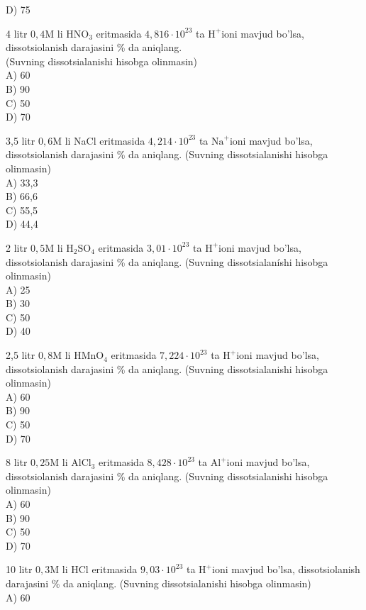 D) 75
  \item 4 litr $0,4 \mathrm{M}$ li $\mathrm{HNO}_{3}$ eritmasida $4,816 \cdot 10^{23}$ ta $\mathrm{H}^{+}$ioni mavjud bo'lsa, dissotsiolanish darajasini \% da aniqlang.\\
(Suvning dissotsialanishi hisobga olinmasin)\\
A) 60\\
B) 90\\
C) 50\\
D) 70
  \item 3,5 litr $0,6 \mathrm{M}$ li NaCl eritmasida $4,214 \cdot 10^{23}$ ta $\mathrm{Na}^{+}$ioni mavjud bo'lsa, dissotsiolanish darajasini \% da aniqlang. (Suvning dissotsialanishi hisobga olinmasin)\\
A) 33,3\\
B) 66,6\\
C) 55,5\\
D) 44,4
  \item 2 litr $0,5 \mathrm{M}$ li $\mathrm{H}_{2} \mathrm{SO}_{4}$ eritmasida $3,01 \cdot 10^{23}$ ta $\mathrm{H}^{+}$ioni mavjud bo'lsa, dissotsiolanish darajasini \% da aniqlang. (Suvning dissotsialaníshi hisobga olinmasin)\\
A) 25\\
B) 30\\
C) 50\\
D) 40
  \item 2,5 litr $0,8 \mathrm{M}$ li $\mathrm{HMnO}_{4}$ eritmasida $7,224 \cdot 10^{23}$ ta $\mathrm{H}^{+}$ioni mavjud bo'lsa, dissotsiolanish darajasini \% da aniqlang. (Suvning dissotsialanishi hisobga olinmasin)\\
A) 60\\
B) 90\\
C) 50\\
D) 70
  \item 8 litr $0,25 \mathrm{M}$ li $\mathrm{AlCl}_{3}$ eritmasida $8,428 \cdot 10^{23}$ ta $\mathrm{Al}^{+}$ioni mavjud bo'lsa, dissotsiolanish darajasini \% da aniqlang. (Suvning dissotsialanishi hisobga olinmasin)\\
A) 60\\
B) 90\\
C) 50\\
D) 70
  \item 10 litr $0,3 \mathrm{M}$ li HCl eritmasida $9,03 \cdot 10^{23}$ ta $\mathrm{H}^{+}$ioni mavjud bo'lsa, dissotsiolanish darajasini \% da aniqlang. (Suvning dissotsialanishi hisobga olinmasin)\\
A) 60\\
